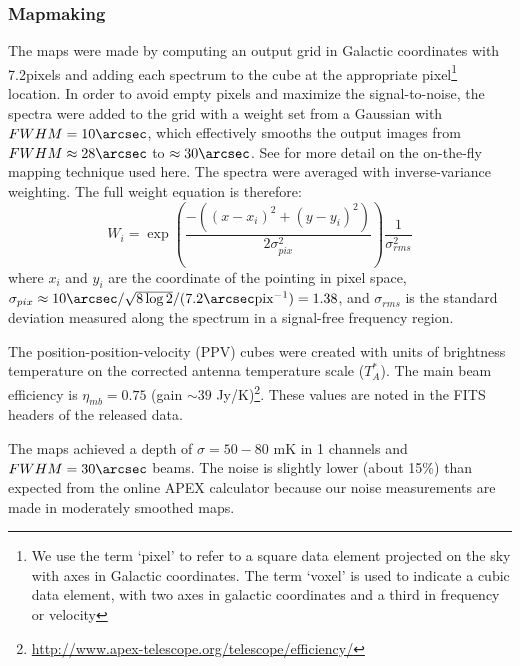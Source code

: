 \subsubsection{Mapmaking}
The maps were made by computing an output grid in Galactic coordinates with
7.2\arcsec pixels and adding each spectrum to the cube at the appropriate
pixel\footnote{We use the term `pixel' to refer to a square data element
projected on the sky with axes in Galactic coordinates.  The term `voxel' is
used to indicate a cubic data element, with two axes in galactic coordinates
and a third in frequency or velocity} location.  In order
to avoid empty pixels and maximize the signal-to-noise, the spectra were added
to the grid with a weight set from a Gaussian with $FWHM=10\arcsec$, which
effectively smooths the output images from $FWHM\approx28\arcsec$ to
$\approx30\arcsec$.  See \citet{Mangum2007a} for more detail on the on-the-fly
mapping technique used here.  The spectra were averaged with inverse-variance
weighting.  The full weight equation is therefore:
\begin{equation}
    W_i = \exp\left(\frac{-\left((x-x_i)^2+(y-y_i)^2\right)}{2\sigma_{pix}^2}\right)
          \frac{1}{\sigma_{rms}^2}
\end{equation}
where $x_i$ and $y_i$ are the coordinate of the pointing in pixel space,
$\sigma_{pix}\approx10\arcsec/\sqrt{8\log{2}}/(7.2\arcsec \textrm{pix}^{-1})=1.38$,
and $\sigma_{rms}$ is the standard deviation measured along the spectrum in a
signal-free frequency region.



The position-position-velocity (PPV) cubes were created with units of
brightness temperature on the corrected antenna temperature scale ($T_A^*$).
The main beam efficiency is $\eta_{mb} = 0.75$ (gain $\sim39$
Jy/K)\footnote{\url{http://www.apex-telescope.org/telescope/efficiency/}}.
These values are noted in the FITS headers of the released data.

The maps achieved a depth of $\sigma=50-80$ mK in 1 \kms channels and
$FWHM=30\arcsec$ beams.  The noise is slightly lower (about 15\%) than expected
from the online APEX calculator because our noise measurements are made in
moderately smoothed maps.

